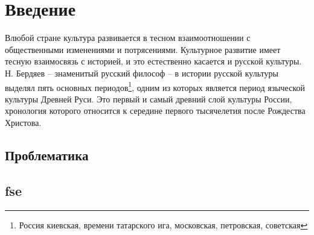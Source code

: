 \documentclass[a4paper, 12pt]{report}
\begin{document}
\setcounter{page}{2}
 
\newpage
     
    \tableofcontents %
\newpage
 
\newpage


\chapter{Введение}

Влюбой стране культура развивается в тесном взаимоотношении с общественными изменениями и потрясениями. Культурное развитие имеет тесную
взаимосвязь с историей, и это естественно касается и русской культуры. Н. Бердяев – знаменитый русский философ – в истории русской культуры
выделял пять основных периодов\footnote{Россия киевская, времени татарского ига, московская, петровская, советская}, одним из которых является период языческой культуры Древней Руси. Это первый и самый древний слой культуры России, хронология которого относится к середине первого тысячелетия после Рождества Христова.

\section{Проблематика} 



\section{fse}
 
\end{document}
